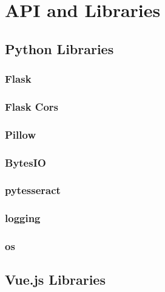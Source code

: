 \chapter{API and Libraries}
\label{chap:API_Libaryies}




\section{Python Libraries}

\subsection{Flask}

\subsection{Flask Cors}

\subsection{Pillow}

\subsection{BytesIO}

\subsection{pytesseract}

\subsection{logging}

\subsection{os}




\section{Vue.js Libraries}

